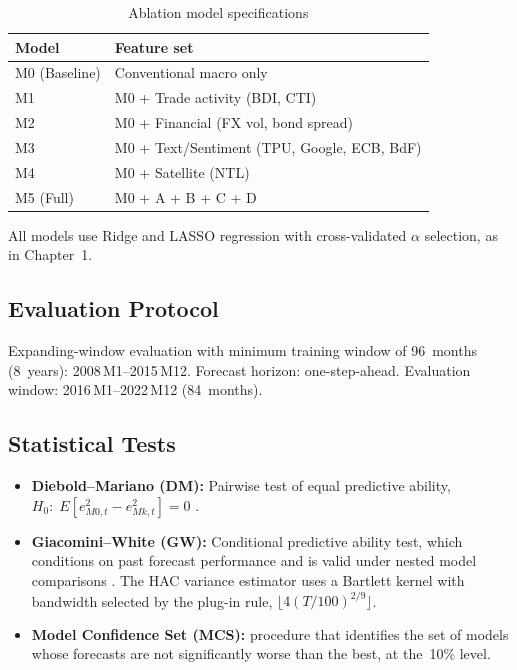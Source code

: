 \begin{table}[htbp]
\centering
\caption{Ablation model specifications}
\label{tab:ch2_ablation_spec}
\begin{tabular}{@{} l l @{}}
\toprule
{Model} & {Feature set} \\
\midrule
M0 (Baseline) & Conventional macro only \\
M1 & M0 + Trade activity (BDI, CTI) \\
M2 & M0 + Financial (FX vol, bond spread) \\
M3 & M0 + Text/Sentiment (TPU, Google, ECB, BdF) \\
M4 & M0 + Satellite (NTL) \\
M5 (Full) & M0 + A + B + C + D \\
\bottomrule
\end{tabular}
\end{table}

All models use Ridge and LASSO regression with cross-validated $\alpha$ selection, as in Chapter~1.

\subsection{Evaluation Protocol}

Expanding-window evaluation with minimum training window of 96~months (8~years): 2008\,M1--2015\,M12.  Forecast horizon: one-step-ahead.  Evaluation window: 2016\,M1--2022\,M12 (84~months).

\subsection{Statistical Tests}

\begin{itemize}
  \item \textbf{Diebold--Mariano (DM):} Pairwise test of equal predictive ability, $H_0{:}\; E[e_{M0,t}^2 - e_{Mk,t}^2] = 0$ \citep{diebold1995comparing}.
  \item \textbf{Giacomini--White (GW):} Conditional predictive ability test, which conditions on past forecast performance and is valid under nested model comparisons \citep{giacomini2006tests}.  The HAC variance estimator uses a Bartlett kernel with bandwidth selected by the \citet{newey1994automatic} plug-in rule, $\lfloor 4(T/100)^{2/9}\rfloor$.
  \item \textbf{Model Confidence Set (MCS):} \citet{hansen2011model} procedure that identifies the set of models whose forecasts are not significantly worse than the best, at the~10\% level.
\end{itemize}


